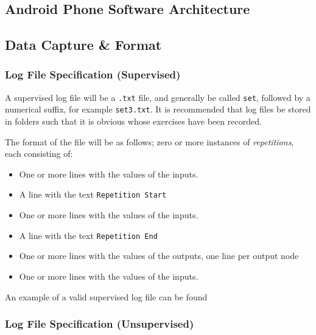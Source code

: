 \documentclass[a4paper]{article}
\begin{document}
\subsection{Android Phone Software Architecture}%


\subsection{Data Capture \& Format}%


\subsubsection{Log File Specification (Supervised)}

A supervised log file will be a \lstinline{.txt} file, and generally be called \lstinline{set}, followed by a numerical suffix, for example \lstinline{set3.txt}. It is recommended that log files be stored in folders such that it is obvious whose exercises have been recorded.

The format of the file will be as follows; zero or more instances of \emph{repetitions}, each consisting of:

\begin{itemize}
\item One or more lines with the values of the inputs.
\item A line with the text \lstinline{Repetition Start}
\item One or more lines with the values of the inputs.
\item A line with the text \lstinline{Repetition End}
\item One or more lines with the values of the outputs, one line per output node
\item One or more lines with the values of the inputs.
\end{itemize}

An example of a valid supervised log file can be found 

\subsubsection{Log File Specification (Unsupervised)}
\end{document}
